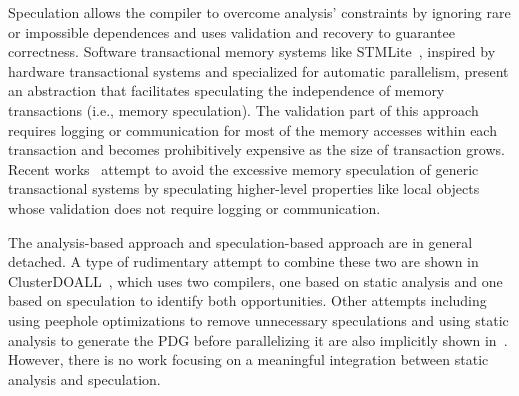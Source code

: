 Speculation allows the compiler to overcome analysis' constraints by ignoring
rare or impossible dependences and uses validation and recovery to guarantee
correctness. Software transactional memory systems like
STMLite~\cite{mehrara:09:stmlite}, inspired by hardware transactional systems
and specialized for automatic parallelism, present an abstraction that
facilitates speculating the independence of memory transactions (i.e., memory
speculation). The validation part of this approach requires logging or
communication for most of the memory accesses within each transaction and
becomes prohibitively expensive as the size of transaction grows.
Recent works~\cite{ctian:2008:micro,johnson:12:pldi,kim:12:cgo} attempt to avoid
the excessive memory speculation of generic transactional systems by speculating
higher-level properties like local objects whose validation does not require
logging or communication.



The analysis-based approach and speculation-based approach are in general
detached. A type of rudimentary attempt to combine these two are shown in
ClusterDOALL~\cite{kim:12:cgo}, which uses two compilers, one based on static
analysis and one based on speculation to identify both opportunities. Other
attempts including using peephole optimizations to remove unnecessary
speculations and using static analysis to generate the PDG before parallelizing
it are also implicitly shown in~\cite{johnson:12:pldi,ctian:2008:micro}.
However, there is no work focusing on a meaningful integration between static
analysis and speculation.


